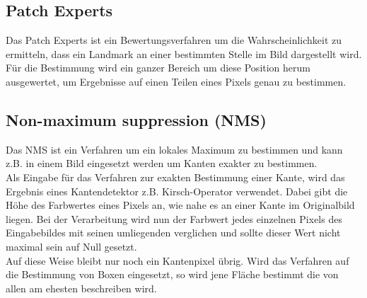 \subsection{Patch Experts}
Das Patch Experts ist ein Bewertungsverfahren um die Wahrscheinlichkeit zu ermitteln, dass ein Landmark an einer bestimmten Stelle im Bild dargestellt wird. Für die Bestimmung wird ein ganzer Bereich um diese Position herum ausgewertet, um Ergebnisse auf einen Teilen eines Pixels genau zu bestimmen.
\cite{CLNF}
\subsection{Non-maximum suppression  (NMS)}
Das NMS ist ein Verfahren um ein lokales Maximum zu bestimmen und kann z.B. in einem Bild eingesetzt werden um Kanten exakter zu bestimmen.\\
Als Eingabe für das Verfahren zur exakten Bestimmung einer Kante, wird das Ergebnis eines Kantendetektor z.B. Kirsch-Operator verwendet. Dabei gibt die Höhe des Farbwertes eines Pixels an, wie nahe es an einer Kante im Originalbild liegen. Bei der Verarbeitung wird nun der Farbwert jedes einzelnen Pixels des Eingabebildes mit seinen umliegenden verglichen und sollte dieser Wert nicht maximal sein auf Null gesetzt.\\
Auf diese Weise bleibt nur noch ein Kantenpixel übrig. Wird das Verfahren auf die Bestimmung von Boxen eingesetzt, so wird jene Fläche bestimmt die von allen am ehesten beschreiben wird.
\cite{NMS}\cite{wiki_Canny}

